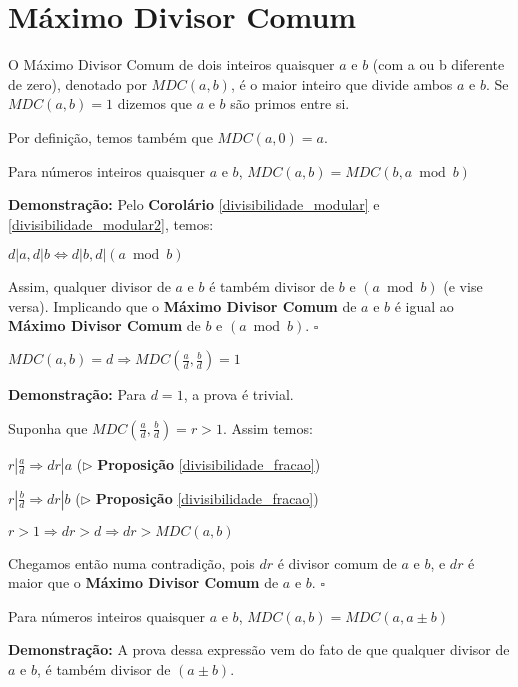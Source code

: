\section{Máximo Divisor Comum}

\begin{definition}
O Máximo Divisor Comum de dois inteiros quaisquer $a$ e $b$ (com a ou b diferente de zero), denotado por $MDC(a,b)$, é o maior inteiro que divide ambos $a$ e $b$. 
Se $MDC(a,b) = 1$ dizemos que $a$ e $b$ são primos entre si.

Por definição, temos também que $MDC(a,0) = a$.
\end{definition}


\begin{corollary}\label{gcd_modular}
Para números inteiros quaisquer $a$ e $b$, $MDC(a,b) = MDC(b, a \bmod b)$
\end{corollary}
\textbf{Demonstração:}
Pelo \textbf{Corolário} \autoref{divisibilidade_modular} e \autoref{divisibilidade_modular2}, temos:

$d|a, d|b \Leftrightarrow d|b, d|(a \bmod b)$

Assim, qualquer divisor de $a$ e $b$ é também divisor de $b$ e $(a \bmod b)$ (e vise versa). Implicando que o \textbf{Máximo Divisor Comum} de $a$ e $b$
é igual ao \textbf{Máximo Divisor Comum} de $b$ e $(a \bmod b)$. $\square$



\begin{proposition}\label{divisibilidade_mdc}
$MDC(a,b) = d \Rightarrow MDC(\frac{a}{d}, \frac{b}{d}) = 1$
\end{proposition}
\textbf{Demonstração:}
Para $d = 1$, a prova é trivial.

Suponha que $MDC(\frac{a}{d}, \frac{b}{d}) = r > 1$. Assim temos:

$r|\frac{a}{d} \Rightarrow dr|a$ ($\triangleright$ \textbf{Proposição} \autoref{divisibilidade_fracao})

$r|\frac{b}{d} \Rightarrow dr|b$ ($\triangleright$ \textbf{Proposição} \autoref{divisibilidade_fracao})

$r > 1 \Rightarrow dr > d \Rightarrow dr > MDC(a,b)$

Chegamos então numa contradição, pois $dr$ é divisor comum de $a$ e $b$, e $dr$ é maior que o \textbf{Máximo Divisor Comum} de $a$ e $b$. $\square$



\begin{proposition}\label{corolario_gcd_soma}
Para números inteiros quaisquer $a$ e $b$, $MDC(a,b) = MDC(a,a \pm b)$
\end{proposition}
\textbf{Demonstração:}
A prova dessa expressão vem do fato de que qualquer divisor de $a$ e $b$, é também divisor de $(a \pm b)$.



